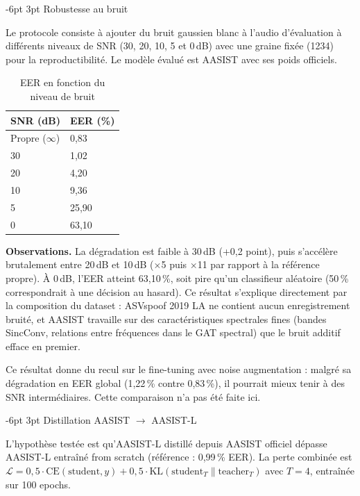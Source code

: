 \documentclass[10pt, a4paper]{article}
\makeatletter
\renewcommand{\subsection}{\@startsection{subsection}{2}{\z@}%
  {-6pt \@plus -2pt \@minus -1pt}{3pt \@plus 1pt}%
  {\normalfont\large\bfseries}}
\makeatother
\begin{document}
\subsection{Robustesse au bruit}
\label{sec:robustesse}

Le protocole consiste à ajouter du bruit gaussien blanc à l'audio d'évaluation à différents niveaux de SNR (30, 20, 10, 5 et 0\,dB) avec une graine fixée (1234) pour la reproductibilité. Le modèle évalué est AASIST avec ses poids officiels.

\begin{table}[H]
\centering\small
\caption{EER en fonction du niveau de bruit}
\begin{tabular}{@{}ll@{}}
\toprule
SNR (dB) & EER (\%) \\
\midrule
Propre ($\infty$) & 0,83 \\
30 & 1,02 \\
20 & 4,20 \\
10 & 9,36 \\
5  & 25,90 \\
0  & 63,10 \\
\bottomrule
\end{tabular}
\end{table}

\noindent\textbf{Observations.} La dégradation est faible à 30\,dB (+0,2 point), puis s'accélère brutalement entre 20\,dB et 10\,dB ($\times$5 puis $\times$11 par rapport à la référence propre). À 0\,dB, l'EER atteint 63,10\,\%, soit pire qu'un classifieur aléatoire (50\,\% correspondrait à une décision au hasard). Ce résultat s'explique directement par la composition du dataset : ASVspoof 2019 LA ne contient aucun enregistrement bruité, et AASIST travaille sur des caractéristiques spectrales fines (bandes SincConv, relations entre fréquences dans le GAT spectral) que le bruit additif efface en premier.

Ce résultat donne du recul sur le fine-tuning avec noise augmentation : malgré sa dégradation en EER global (1,22\,\% contre 0,83\,\%), il pourrait mieux tenir à des SNR intermédiaires. Cette comparaison n'a pas été faite ici.

\subsection{Distillation AASIST $\rightarrow$ AASIST-L}

L'hypothèse testée est qu'AASIST-L distillé depuis AASIST officiel dépasse AASIST-L entraîné from scratch (référence : 0,99\,\% EER). La perte combinée est $\mathcal{L} = 0{,}5 \cdot \text{CE}(\text{student}, y) + 0{,}5 \cdot \text{KL}(\text{student}_T \| \text{teacher}_T)$ avec $T=4$, entraînée sur 100 epochs.
\end{document}
